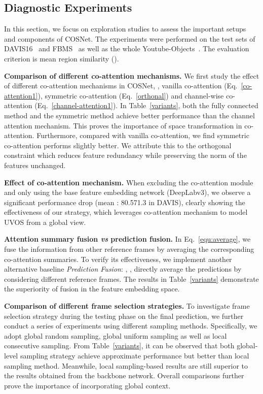 \documentclass[10pt,twocolumn,letterpaper]{article}
\begin{document}
\subsection{Diagnostic Experiments}\label{sec:ablation}
In this section, we focus on exploration studies to assess the important setups and components of COSNet. The experiments were performed on the test sets of DAVIS16~\cite{perazzi2016benchmark} and FBMS~\cite{DBLP:journals/pami/OchsMB14} as well as the whole Youtube-Objects~\cite{DBLP:conf/cvpr/PrestLCSF12}. The  evaluation criterion is mean region similarity ().


\noindent\textbf{Comparison of different co-attention mechanisms.}
We first study the effect of different co-attention mechanisms in COSNet, \ie, vanilla co-attention (Eq.~\ref{co-attention1}), symmetric co-attention (Eq.~\ref{orthonal}) and channel-wise co-attention (Eq.~\ref{channel-attention1}). In Table~\ref{variants}, both the fully connected method and the symmetric method achieve better performance than the channel attention mechanism. This proves the importance of space transformation in co-attention. Furthermore, compared with vanilla co-attention, we find symmetric co-attention performs slightly better. We attribute this to the orthogonal constraint which reduces feature redundancy  while preserving the norm of the features unchanged.

\noindent\textbf{Effect of co-attention mechanism.}
When excluding the co-attention module and only using the base feature embedding network (DeepLabv3),  we observe a significant performance drop (mean : 80.571.3 in DAVIS), clearly showing the effectiveness of our strategy, which leverages co-attention mechanism to model UVOS from a global view.

\noindent\textbf{Attention summary fusion \textit{vs} prediction fusion.} In Eq.~\ref{equ:average}, we fuse the information from other reference frames by averaging the corresponding co-attention summaries. To verify its effectiveness, we implement another alternative baseline \textit{Prediction Fusion}: , \ie, directly average the predictions by considering different reference frames. The results in Table~\ref{variants} demonstrate the superiority of fusion in the feature embedding space.

\noindent\textbf{Comparison of different frame selection strategies.}
To investigate frame selection strategy during the testing phase on the final prediction, we further conduct a series of experiments using different sampling methods. Specifically, we adopt global random sampling, global uniform sampling as well as local consecutive sampling. From Table~\ref{variants}, it can be observed that both global-level sampling strategy achieve approximate performance but better than local sampling method. Meanwhile, local sampling-based results are still superior to the results obtained from the backbone network. Overall comparisons further prove the importance of incorporating global context.
\end{document}
